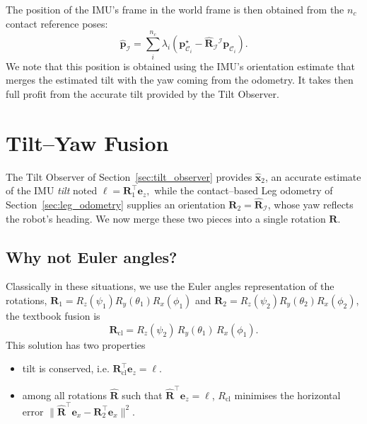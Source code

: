 \documentclass{IJCAS}
\begin{document}
The position of the IMU's frame in the world frame is then obtained from the $n_{c}$ contact reference poses: 
\begin{equation}
    \hat{\boldsymbol{p}}_{\mathcal{I}} = \sum^{n_{c}}_{i} \lambda_{i} \left( \boldsymbol{p}^{\star}_{{\mathcal{C}}_{i}} - \hat{\boldsymbol{R}}_{\mathcal{I}} {}^{\mathcal{I}}\boldsymbol{p}_{{\mathcal{C}}_{i}} \right).
\end{equation}
We note that this position is obtained using the IMU's orientation estimate that merges the estimated tilt with the yaw coming from the odometry. It takes then full profit from the accurate tilt provided by the Tilt Observer.


\section{Tilt--Yaw Fusion}
\label{sec:axisAgnostic}

The Tilt Observer of Section~\ref{sec:tilt_observer} provides $\hat{\boldsymbol{x}}_{2}$,  an accurate
estimate of the IMU \emph{tilt} noted
\(
  \boldsymbol{\ell}=\boldsymbol{R}_{1}^{\top}\boldsymbol{e}_{z},
\)
while the contact–based Leg odometry of
Section~\ref{sec:leg_odometry} supplies an orientation \(\boldsymbol{R}_{2} = \hat{\boldsymbol{R}}_{\mathcal{I}}\), whose
yaw reflects the robot's heading.  We now merge these two pieces into a
single rotation \(\boldsymbol{R}\).

\subsection{Why not Euler angles?}

Classically in these situations, we use the Euler angles representation of the rotations,
\(\boldsymbol{R}_{1}=R_{z}(\psi_{1})R_{y}(\theta_{1})R_{x}(\phi_{1})\) and
\(\boldsymbol{R}_{2}=R_{z}(\psi_{2})R_{y}(\theta_{2})R_{x}(\phi_{2})\),
the textbook fusion is
\begin{equation}
  \boldsymbol{R}_{\mathrm{cl}}
  =R_{z}(\psi_{2})\,R_{y}(\theta_{1})\,R_{x}(\phi_{1}).
  \label{eq:fusion_classic}
\end{equation}
This solution has two properties
\begin{itemize}
\item tilt is conserved, i.e. 
\(\boldsymbol{R}_{\mathrm{cl}}^{\top}\boldsymbol{e}_{z}=\boldsymbol{\ell}\).
\item among all rotations \(\hat{\boldsymbol{R}}\) such that
\(\hat{\boldsymbol{R}}^{\top}\boldsymbol{e}_{z}=\boldsymbol{\ell}\),
\(R_{\mathrm{cl}}\) minimises the horizontal error
\(
  \|
    \hat{\boldsymbol{R}}^{\top}\boldsymbol{e}_{x}-\boldsymbol{R}_{2}^{\top}\boldsymbol{e}_{x}
  \|^{2}.
\)
\end{itemize}
\end{document}
